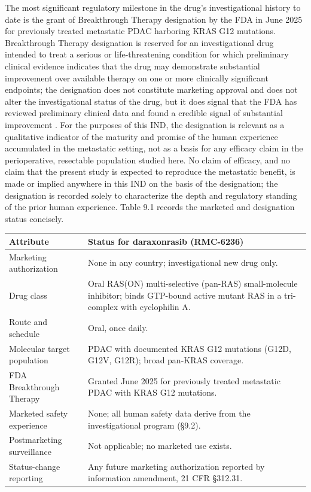 The most significant regulatory milestone in the drug's investigational history to
date is the grant of Breakthrough Therapy designation by the FDA in June 2025 for
previously treated metastatic PDAC harboring KRAS G12 mutations. Breakthrough
Therapy designation is reserved for an investigational drug intended to treat a
serious or life-threatening condition for which preliminary clinical evidence
indicates that the drug may demonstrate substantial improvement over available
therapy on one or more clinically significant endpoints; the designation does not
constitute marketing approval and does not alter the investigational status of the
drug, but it does signal that the FDA has reviewed preliminary clinical data and
found a credible signal of substantial improvement \cite{daraxwhipple,
phase1guidance}. For the purposes of this IND, the designation is relevant as a
qualitative indicator of the maturity and promise of the human experience
accumulated in the metastatic setting, not as a basis for any efficacy claim in the
perioperative, resectable population studied here. No claim of efficacy, and no
claim that the present study is expected to reproduce the metastatic benefit, is
made or implied anywhere in this IND on the basis of the designation; the
designation is recorded solely to characterize the depth and regulatory standing
of the prior human experience. Table 9.1 records the marketed and designation
status concisely.

\noindent\begin{tabularx}{\textwidth}{L{4.4cm} Y}
\toprule
\textbf{Attribute} & \textbf{Status for daraxonrasib (RMC-6236)} \\
\midrule
Marketing authorization & None in any country; investigational new drug only. \\
Drug class & Oral RAS(ON) multi-selective (pan-RAS) small-molecule inhibitor; binds GTP-bound active mutant RAS in a tri-complex with cyclophilin A. \\
Route and schedule & Oral, once daily. \\
Molecular target population & PDAC with documented KRAS G12 mutations (G12D, G12V, G12R); broad pan-KRAS coverage. \\
FDA Breakthrough Therapy & Granted June 2025 for previously treated metastatic PDAC with KRAS G12 mutations. \\
Marketed safety experience & None; all human safety data derive from the investigational program (\S 9.2). \\
Postmarketing surveillance & Not applicable; no marketed use exists. \\
Status-change reporting & Any future marketing authorization reported by information amendment, 21 CFR \S 312.31. \\
\bottomrule
\end{tabularx}
\vspace{-0.2cm}

